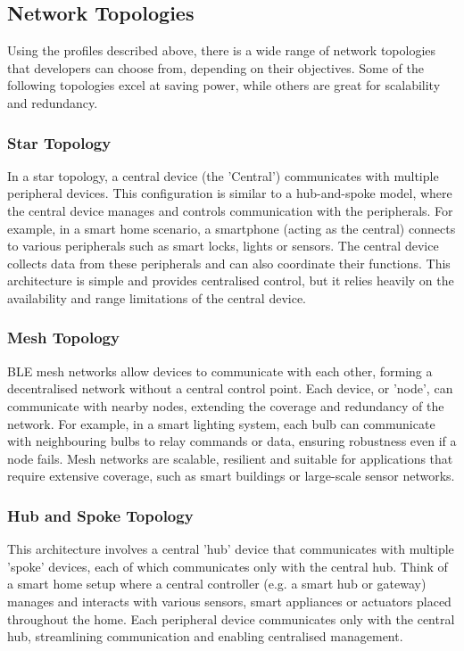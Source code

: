 \subsection{Network Topologies}
Using the profiles described above, there is a wide range of network topologies that developers can choose from, depending on their objectives.
Some of the following topologies excel at saving power, while others are great for scalability and redundancy.

\subsubsection{Star Topology}
In a star topology, a central device (the 'Central') communicates with multiple peripheral devices. This configuration is similar to a hub-and-spoke model, where the central device manages and controls communication with the peripherals. For example, in a smart home scenario, a smartphone (acting as the central) connects to various peripherals such as smart locks, lights or sensors. The central device collects data from these peripherals and can also coordinate their functions. This architecture is simple and provides centralised control, but it relies heavily on the availability and range limitations of the central device.

\subsubsection{Mesh Topology}
BLE mesh networks allow devices to communicate with each other, forming a decentralised network without a central control point. Each device, or 'node', can communicate with nearby nodes, extending the coverage and redundancy of the network. For example, in a smart lighting system, each bulb can communicate with neighbouring bulbs to relay commands or data, ensuring robustness even if a node fails. Mesh networks are scalable, resilient and suitable for applications that require extensive coverage, such as smart buildings or large-scale sensor networks.

\subsubsection{Hub and Spoke Topology}
This architecture involves a central 'hub' device that communicates with multiple 'spoke' devices, each of which communicates only with the central hub. Think of a smart home setup where a central controller (e.g. a smart hub or gateway) manages and interacts with various sensors, smart appliances or actuators placed throughout the home. Each peripheral device communicates only with the central hub, streamlining communication and enabling centralised management.

